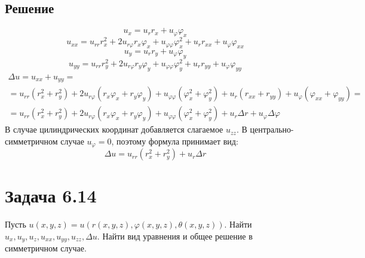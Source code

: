 \documentclass[11pt]{article}
\newcounter{th}\setcounter{th}{0}
\begin{document}
\subsection{Решение}
\label{sec:orgbef5810}
$$u_x = u_rr_x + u_{\varphi}\varphi_x$$
$$u_{xx} = u_{rr}r_x^2 + 2u_{r\varphi}r_x\varphi_x + u_{\varphi\varphi}\varphi_x^2 + u_rr_{xx} + u_{\varphi}\varphi_{xx}$$
$$u_y = u_rr_y + u_{\varphi}\varphi_y$$
$$u_{yy} = u_{rr}r_y^2 + 2u_{r\varphi}r_y\varphi_y + u_{\varphi\varphi}\varphi_y^2 + u_rr_{yy} + u_{\varphi}\varphi_{yy}$$
\begin{multline}
\Delta u = u_{xx} + u_{yy} = \\
= u_{rr}(r_x^2 + r_y^2) + 2u_{r\varphi}(r_x\varphi_x + r_y\varphi_y) +
u_{\varphi\varphi}(\varphi_x^2 + \varphi_y^2) + u_r(r_{xx} + r_{yy}) + u_{\varphi}(\varphi_{xx} + \varphi_{yy}) = \\
= u_{rr}(r_x^2 + r_y^2) + 2u_{r\varphi}(r_x\varphi_x + r_y\varphi_y) + u_{\varphi\varphi}(\varphi_x^2 + \varphi_y^2)
+ u_r\Delta r + u_{\varphi}\Delta\varphi
\end{multline}
В случае цилиндрических координат добавляется слагаемое $u_{zz}$. В центрально-симметричном
случае $u_{\varphi} = 0$, поэтому формула принимает вид:
\begin{equation}
\Delta u = u_{rr}(r_x^2 + r_y^2) + u_r\Delta r
\end{equation}
\section{Задача 6.14}
\label{sec:orgd95e517}
Пусть $u(x, y, z) = u(r(x, y, z), \varphi(x, y, z), \theta(x, y, z))$. Найти $u_x, u_y, u_z,
u_{xx}, u_{yy}, u_{zz}, \Delta u$. Найти вид уравнения и общее решение в симметричном случае.
\end{document}
